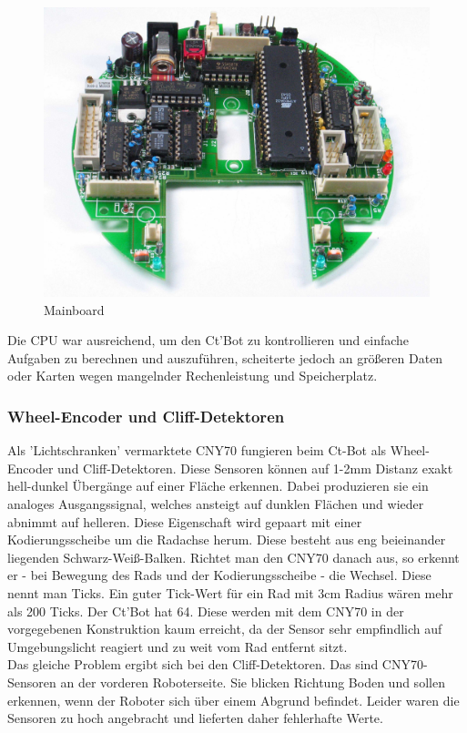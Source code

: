 \documentclass[twoside,11pt, a4paper]{report}
\begin{document}
	\begin{figure}[!htb]
		\centering
		\includegraphics[scale=0.1]{images/mainboard.jpg}
		\caption{Mainboard}
	\end{figure}
	
	Die CPU war ausreichend, um den Ct'Bot zu kontrollieren und einfache Aufgaben zu berechnen und auszuführen, scheiterte jedoch an größeren Daten oder Karten wegen mangelnder Rechenleistung und Speicherplatz. 
	
	\subsubsection{Wheel-Encoder und Cliff-Detektoren}
	Als 'Lichtschranken' vermarktete CNY70 fungieren beim Ct-Bot als Wheel-Encoder und Cliff-Detektoren. Diese Sensoren können auf 1-2mm Distanz exakt hell-dunkel Übergänge auf einer Fläche erkennen. Dabei produzieren sie ein analoges Ausgangssignal, welches ansteigt auf dunklen Flächen und wieder abnimmt auf helleren. Diese Eigenschaft wird gepaart mit einer Kodierungsscheibe um die Radachse herum. Diese besteht aus eng beieinander liegenden Schwarz-Weiß-Balken. Richtet man den CNY70 danach aus, so erkennt er - bei Bewegung des Rads und der Kodierungsscheibe - die Wechsel. Diese nennt man Ticks. Ein guter Tick-Wert für ein Rad mit 3cm Radius wären mehr als 200 Ticks. Der Ct'Bot hat 64. Diese werden mit dem CNY70 in der vorgegebenen Konstruktion kaum erreicht, da der Sensor sehr empfindlich auf Umgebungslicht reagiert und zu weit vom Rad entfernt sitzt. \\
	Das gleiche Problem ergibt sich bei den Cliff-Detektoren. Das sind CNY70-Sensoren an der vorderen Roboterseite. Sie blicken Richtung Boden und sollen erkennen, wenn der Roboter sich über einem Abgrund befindet. Leider waren die Sensoren zu hoch angebracht und lieferten daher fehlerhafte Werte. 
	
\end{document}
